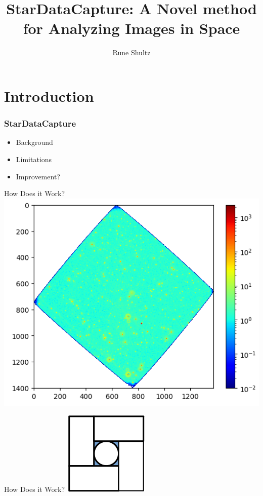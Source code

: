 \documentclass[10pt,aspectratio=169]{beamer}
\title[]{StarDataCapture: A Novel method for Analyzing Images in Space}
\institute[]{Institute for Computing in Research, Santa Fe}
\author{Rune Shultz}
\begin{document}
\section{Introduction}
{
\frame{\titlepage}
}

\begin{frame}\Huge
  \frametitle{StarDataCapture}
  \begin{itemize}
      \centering
      \item Background
      \item Limitations
      \item Improvement?
  \end{itemize}
\end{frame}

\begin{frame}{How Does it Work?}
  \centering
  \includegraphics[scale = .5]{starexample.png}
\end{frame}

\begin{frame}{How Does it Work?}
  \centering
  \includegraphics[scale = .75]{circleshape.png}
\end{frame}
\end{document}
